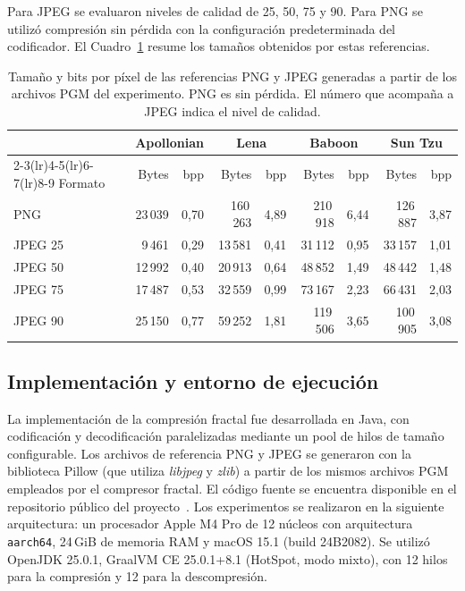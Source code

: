 Para JPEG se evaluaron niveles de calidad de 25, 50, 75 y 90. Para PNG se utilizó compresión sin pérdida con la configuración predeterminada del codificador. El Cuadro~\ref{tab:referencias} resume los tamaños obtenidos por estas referencias.

\begin{table}[htbp]
\centering
\caption{Tamaño y bits por píxel de las referencias PNG y JPEG generadas a partir de los archivos PGM del experimento. PNG es sin pérdida. El número que acompaña a JPEG indica el nivel de calidad.}
\label{tab:referencias}
\scriptsize
\setlength{\tabcolsep}{2.5pt}
\begin{tabular}{lrrrrrrrr}
\toprule
& \multicolumn{2}{c}{Apollonian} & \multicolumn{2}{c}{Lena} & \multicolumn{2}{c}{Baboon} & \multicolumn{2}{c}{Sun Tzu} \\
\cmidrule(lr){2-3}\cmidrule(lr){4-5}\cmidrule(lr){6-7}\cmidrule(lr){8-9}
Formato & Bytes & bpp & Bytes & bpp & Bytes & bpp & Bytes & bpp \\
\midrule
PNG     & 23\,039 & 0,70 & 160\,263 & 4,89 & 210\,918 & 6,44 & 126\,887 & 3,87 \\
JPEG 25 &  9\,461 & 0,29 &  13\,581 & 0,41 &  31\,112 & 0,95 &  33\,157 & 1,01 \\
JPEG 50 & 12\,992 & 0,40 &  20\,913 & 0,64 &  48\,852 & 1,49 &  48\,442 & 1,48 \\
JPEG 75 & 17\,487 & 0,53 &  32\,559 & 0,99 &  73\,167 & 2,23 &  66\,431 & 2,03 \\
JPEG 90 & 25\,150 & 0,77 &  59\,252 & 1,81 & 119\,506 & 3,65 & 100\,905 & 3,08 \\
\bottomrule
\end{tabular}
\end{table}

\subsection{Implementación y entorno de ejecución}
\label{sec:entorno_ejecucion}

La implementación de la compresión fractal fue desarrollada en Java, con codificación y decodificación paralelizadas mediante un pool de hilos de tamaño configurable. Los archivos de referencia PNG y JPEG se generaron con la biblioteca Pillow (que utiliza \textit{libjpeg} y \textit{zlib}) a partir de los mismos archivos PGM empleados por el compresor fractal. El código fuente se encuentra disponible en el repositorio público del proyecto~\cite{madeoRepositorio}. Los experimentos se realizaron en la siguiente arquitectura: un procesador Apple M4 Pro de 12 núcleos con arquitectura \texttt{aarch64}, 24\,GiB de memoria RAM y macOS 15.1 (build 24B2082). Se utilizó OpenJDK 25.0.1, GraalVM CE 25.0.1+8.1 (HotSpot, modo mixto), con 12 hilos para la compresión y 12 para la descompresión.


